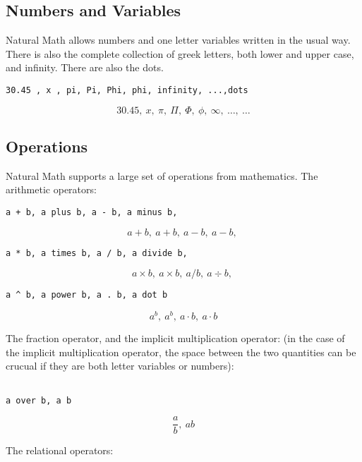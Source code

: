 \documentclass[12pt]{article}
\begin{document}
\noindent \subsection{Numbers and Variables}

\noindent \indent
Natural Math allows numbers and one letter variables written in the usual
way.  There is also the complete collection of greek letters, both
lower and upper case, and infinity.  There are also
the dots.

\begin{verbatim}
30.45 , x , pi, Pi, Phi, phi, infinity, ...,dots
\end{verbatim}

\[
30.45 , \ x , \ \pi , \ \Pi , \ \Phi , \ \phi , \ \infty , \ \dots , \ \dots
\]

\noindent \subsection{Operations}
Natural Math supports a large set of operations from mathematics. 
The arithmetic operators:

\begin{verbatim}
a + b, a plus b, a - b, a minus b,
\end{verbatim}

\[
a + b , \ a + b , \ a - b , \ a - b , \ 
\]

\begin{verbatim}
a * b, a times b, a / b, a divide b,
\end{verbatim}

\[
a \times b , \ a \times b , \ a / b , \ a \div b , \ 
\]

\begin{verbatim}
a ^ b, a power b, a . b, a dot b
\end{verbatim}

\[
{a} ^ {b} , \ {a} ^ {b} , \ a \cdot b , \ a \cdot b
\]

\noindent The fraction operator, and the implicit multiplication operator:
(in the case of the implicit multiplication operator, the space between
the two quantities can be crucual if they are both letter variables or 
numbers):

\begin{verbatim}

a over b, a b
\end{verbatim}

\[
\frac {a} {b} , \ a b
\]

\noindent The relational operators:
\end{document}
